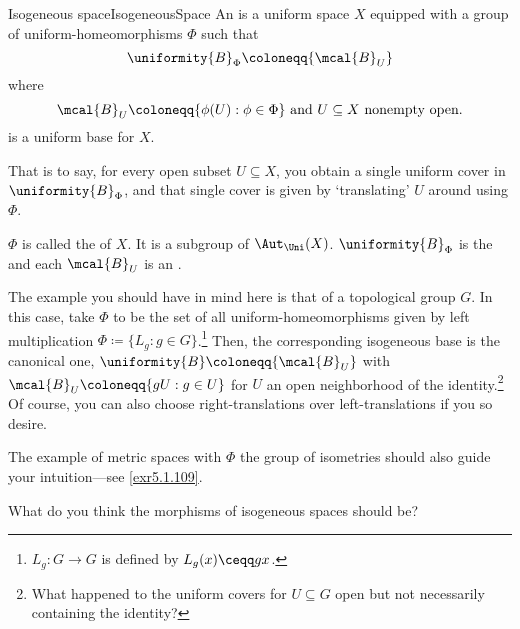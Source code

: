 \begin{dfn}{Isogeneous space}{IsogeneousSpace}
An  is a uniform space $X$ equipped with a group of uniform-homeomorphisms $\Phi$ such that
\begin{equation}\label{5.1.28}
\uniformity{B}_\Phi \coloneqq \{ \mcal{B}_U\}
\end{equation}
where
\begin{equation}
\mcal{B}_U\coloneqq \{ \phi (U):\phi \in \Phi\} \text{ and }U\subseteq X\text{ nonempty open}.
\end{equation}
is a uniform base for $X$.
\begin{rmk}
That is to say, for every open subset $U\subseteq X$, you obtain a single uniform cover in $\uniformity{B}_{\Phi}$, and that single cover is given by `translating' $U$ around using $\Phi$.
\end{rmk}
\begin{rmk}
$\Phi$ is called the  of $X$.  It is a subgroup of $\Aut _{\Uni}(X)$.  $\uniformity{B}_{\Phi}$ is the  and each $\mcal{B}_U$ is an .
\end{rmk}
\begin{rmk}
The example you should have in mind here is that of a topological group $G$.  In this case, take $\Phi$ to be the set of all uniform-homeomorphisms given by left multiplication $\Phi \coloneqq \{ L_g:g\in G\}$.\footnote{$L_g\colon G\rightarrow G$ is defined by $L_g(x)\ceqq gx$.}  Then, the corresponding isogeneous base is the canonical one, $\uniformity{B}\coloneqq \{ \mcal{B}_U\}$ with $\mcal{B}_U\coloneqq \{ gU:g\in U\}$ for $U$ an open neighborhood of the identity.\footnote{What happened to the uniform covers for $U\subseteq G$ open but not necessarily containing the identity?}  Of course, you can also choose right-translations over left-translations if you so desire.
\end{rmk}
\begin{rmk}
The example of metric spaces with $\Phi$ the group of isometries should also guide your intuition---see \cref{exr5.1.109}.
\end{rmk}
\begin{rmk}
What do you think the morphisms of isogeneous spaces should be?
\end{rmk}
\end{dfn}
